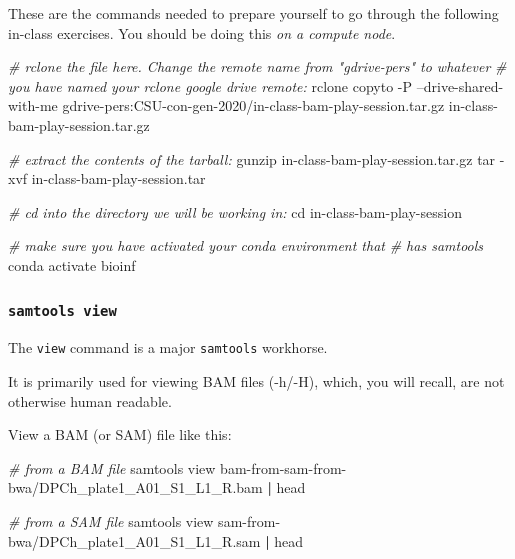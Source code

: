 \documentclass[]{krantz}
\makeatletter
\newenvironment{Shaded}{\begin{snugshade}}{\end{snugshade}}
\newcommand{\BuiltInTok}[1]{#1}
\newcommand{\CommentTok}[1]{\textcolor[rgb]{0.37,0.37,0.37}{\textit{#1}}}
\newcommand{\ExtensionTok}[1]{#1}
\newcommand{\FunctionTok}[1]{\textcolor[rgb]{0,0,0}{#1}}
\newcommand{\KeywordTok}[1]{\textcolor[rgb]{0.27,0.27,0.27}{\textbf{#1}}}
\newcommand{\NormalTok}[1]{#1}
\newenvironment{kframe}{%
\medskip{}
\setlength{\fboxsep}{.8em}
 \def\at@end@of@kframe{}%
 \ifinner\ifhmode%
  \def\at@end@of@kframe{\end{minipage}}%
  \begin{minipage}{\columnwidth}%
 \fi\fi%
 \def\FrameCommand##1{\hskip\@totalleftmargin \hskip-\fboxsep
 \colorbox{shadecolor}{##1}\hskip-\fboxsep
     \hskip-\linewidth \hskip-\@totalleftmargin \hskip\columnwidth}%
 \MakeFramed {\advance\hsize-\width
   \@totalleftmargin\z@ \linewidth\hsize
   \@setminipage}}%
 {\par\unskip\endMakeFramed%
 \at@end@of@kframe}
\renewenvironment{Shaded}{\begin{kframe}}{\end{kframe}}
\makeatother
\begin{document}
These are the commands
needed to prepare yourself to go through the following in-class exercises. You
should be doing this \emph{on a compute node}.

\begin{Shaded}
\begin{Highlighting}[]

\CommentTok{# rclone the file here.  Change the remote name from "gdrive-pers" to whatever}
\CommentTok{# you have named your rclone google drive remote:}
\ExtensionTok{rclone}\NormalTok{ copyto -P  --drive-shared-with-me  gdrive-pers:CSU-con-gen-2020/in-class-bam-play-session.tar.gz in-class-bam-play-session.tar.gz}

\CommentTok{# extract the contents of the tarball:}
\FunctionTok{gunzip}\NormalTok{ in-class-bam-play-session.tar.gz}
\FunctionTok{tar}\NormalTok{ -xvf in-class-bam-play-session.tar}

\CommentTok{# cd into the directory we will be working in:}
\BuiltInTok{cd}\NormalTok{ in-class-bam-play-session}

\CommentTok{# make sure you have activated your conda environment that}
\CommentTok{# has samtools}
\ExtensionTok{conda}\NormalTok{ activate bioinf}
\end{Highlighting}
\end{Shaded}

\hypertarget{samtools-view}{%
\subsubsection{\texorpdfstring{\texttt{samtools\ view}}{samtools view}}\label{samtools-view}}

The \texttt{view} command is a major \texttt{samtools} workhorse.

It is primarily used for viewing BAM files (-h/-H), which, you will recall,
are not otherwise human readable.

View a BAM (or SAM) file like this:

\begin{Shaded}
\begin{Highlighting}[]
\CommentTok{# from a BAM file}
\ExtensionTok{samtools}\NormalTok{ view bam-from-sam-from-bwa/DPCh_plate1_A01_S1_L1_R.bam }\KeywordTok{|} \FunctionTok{head}

\CommentTok{# from a SAM file}
\ExtensionTok{samtools}\NormalTok{ view sam-from-bwa/DPCh_plate1_A01_S1_L1_R.sam }\KeywordTok{|} \FunctionTok{head}
\end{Highlighting}
\end{Shaded}
\end{document}
